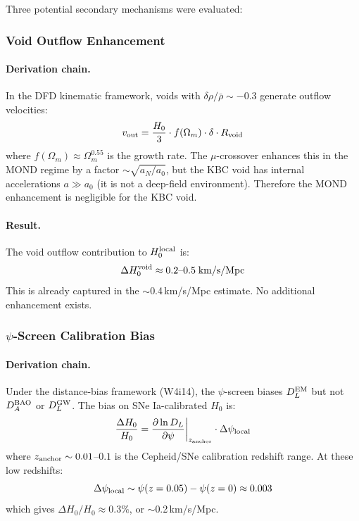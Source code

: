 \documentclass[11pt]{article}
\begin{document}
Three potential secondary mechanisms were evaluated:

\subsubsection{Void Outflow Enhancement}

\paragraph{Derivation chain.}
In the DFD kinematic framework, voids with $\delta \rho / \bar{\rho} \sim -0.3$
generate outflow velocities:
\begin{equation}
v_{\rm out} = \frac{H_0}{3} \cdot f(\Omega_m) \cdot \delta \cdot R_{\rm void}
\end{equation}
where $f(\Omega_m) \approx \Omega_m^{0.55}$ is the growth rate. The
$\mu$-crossover enhances this in the MOND regime by a factor
$\sim \sqrt{a_N/a_0}$, but the KBC void has internal accelerations
$a \gg a_0$ (it is not a deep-field environment). Therefore the
MOND enhancement is negligible for the KBC void.

\paragraph{Result.} The void outflow contribution to $H_0^{\rm local}$ is:
\begin{equation}
\Delta H_0^{\rm void} \approx 0.2\text{--}0.5\;\text{km/s/Mpc}
\end{equation}
This is already captured in the $\sim$0.4\,km/s/Mpc estimate.
No additional enhancement exists.

\subsubsection{$\psi$-Screen Calibration Bias}

\paragraph{Derivation chain.}
Under the distance-bias framework (W4i14), the $\psi$-screen biases
$D_L^{\rm EM}$ but not $D_A^{\rm BAO}$ or $D_L^{\rm GW}$. The bias on
SNe Ia-calibrated $H_0$ is:
\begin{equation}
\frac{\Delta H_0}{H_0} = \frac{\partial \ln D_L}{\partial \psi}
\bigg|_{z_{\rm anchor}} \cdot \Delta\psi_{\rm local}
\end{equation}
where $z_{\rm anchor} \sim 0.01$--$0.1$ is the Cepheid/SNe calibration
redshift range. At these low redshifts:
\begin{equation}
\Delta\psi_{\rm local} \sim \psi(z=0.05) - \psi(z=0) \approx 0.003
\end{equation}
which gives $\Delta H_0/H_0 \approx 0.3\%$, or $\sim$0.2\,km/s/Mpc.
\end{document}
